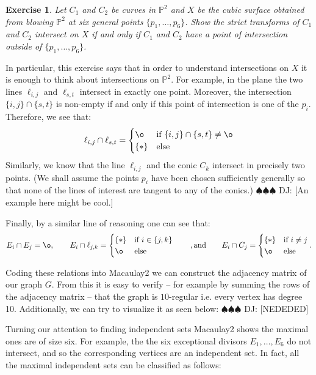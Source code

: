 \documentclass[11pt]{amsart}
\newtheorem{ex}[lemma]{Exercise}
\theoremstyle{remark}
\renewcommand{\P}{\mathbb{P}}
\newcommand{\deej}[1]{{\color{red} \sf $\spadesuit\spadesuit\spadesuit$ DJ: [#1]}}
\begin{document}
\begin{ex}
Let $C_1$ and $C_2$ be curves in $\P^2$ and $X$ be the cubic surface obtained from blowing $\P^2$ at six general points $\{p_1,\ldots,p_6\}$. Show the strict transforms of $C_1$ and $C_2$ intersect on $X$ if and only if $C_1$ and $C_2$ have a point of intersection outside of $\{p_1,\ldots,p_6\}$.
\end{ex}

In particular, this exercise says that in order to understand intersections on $X$ it is enough to think about intersections on $\P^2$. For example, in the plane the two lines $\ell_{i,j}$ and $\ell_{s,t}$ intersect in exactly one point. Moreover, the intersection $\{i,j\}\cap \{s,t\}$ is non-empty if and only if this point of intersection is one of the $p_i$. Therefore, we see that:
\[
\ell_{i,j}\cap \ell_{s,t}=\begin{cases} \o &\mbox{if } \{i,j\}\cap\{s,t\}\neq\o \\ 
\{*\} & \mbox{else }  \end{cases} 
\]
Similarly, we know that the line $\ell_{i,j}$ and the conic $C_{k}$ intersect in precisely two points. (We shall assume the points $p_i$ have been chosen sufficiently generally so that none of the lines of interest are tangent to any of the conics.) \deej{An example here might be cool.}

Finally, by a similar line of reasoning one can see that:
\[
E_i\cap E_j=\o, \quad\quad E_i\cap \ell_{j,k}=\begin{cases} \{*\} &\mbox{if } i\in \{j,k\} \\ 
\o & \mbox{else }  \end{cases} \quad \quad, \text{and} \quad \quad E_i\cap C_j=\begin{cases} \{*\} &\mbox{if } i\neq j \\ 
\o & \mbox{else }  \end{cases}.
\]

Coding these relations into Macaulay2 we can construct the adjacency matrix of our graph $G$. From this it is easy to verify -- for example by summing the rows of the adjacency matrix -- that the graph is $10$-regular i.e. every vertex has degree 10. Additionally, we can try to visualize it as seen below:
\deej{NEDEDED}

Turning our attention to finding independent sets Macaulay2 shows the maximal ones are of size six. For example, the the six exceptional divisors $E_1,\ldots,E_6$ do not intersect, and so the corresponding vertices are an independent set. In fact, all the maximal independent sets can be classified as follows:
\end{document}
